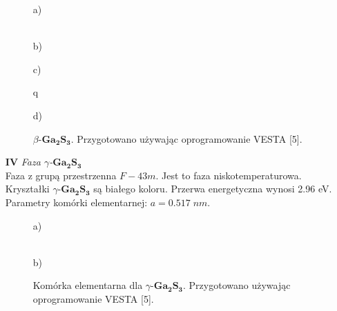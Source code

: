 \begin{enumerate}
	\begin{figure}[H]
		\begin{minipage}[h]{0.47\linewidth}
			 a) \\
		\end{minipage}
		\hfill
		\begin{minipage}[h]{0.47\linewidth}
			 \\b)
		\end{minipage}
		\vfill
		\begin{minipage}[h]{0.47\linewidth}
			 c) \\
		\end{minipage}q
		\hfill
		\begin{minipage}[h]{0.47\linewidth}
			 d) \\
		\end{minipage}
		\caption{$\beta$-$\mathbf{Ga_{2}S_{3}}$. Przygotowano używając oprogramowanie VESTA [5].}
	\end{figure}

	\item[\textbf{IV}] \textit{Faza $\gamma$-$\mathbf{Ga_{2}S_{3}}$} \\
	Faza z grupą przestrzenna $F-43m$. Jest to faza niskotemperaturowa. Kryształki $\gamma$-$\mathbf{Ga_{2}S_{3}}$ są białego koloru. Przerwa energetyczna wynosi 2.96 eV. Parametry komórki elementarnej: $a=0.517\;nm$.
	\begin{center}
		\begin{figure}[H]
			\begin{minipage}[h]{0.47\linewidth}
				 a) \\
			\end{minipage}
			\hfill
			\begin{minipage}[h]{0.47\linewidth}
				 \\b)
			\end{minipage}
			\caption{Komórka elementarna dla $\gamma$-$\mathbf{Ga_{2}S_{3}}$. Przygotowano używając oprogramowanie VESTA [5].}
		\end{figure}
	\end{center}
	
\end{enumerate}

